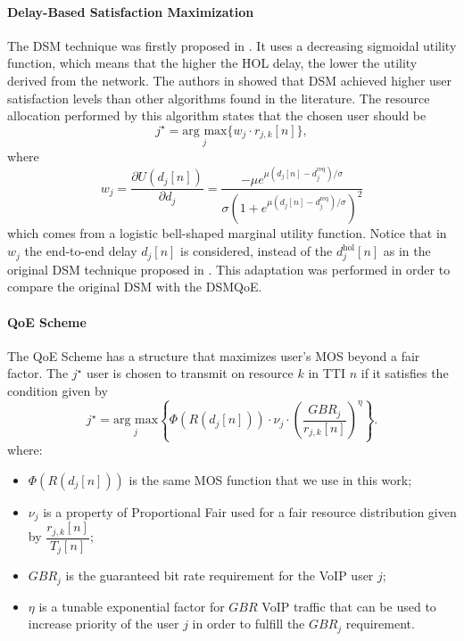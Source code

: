 \documentclass[12pt]{article}
\begin{document}
\paragraph{Delay-Based Satisfaction Maximization\\}
The \ac{DSM} technique was firstly proposed in \cite{Rodrigues2014_Wiley}. It uses a decreasing sigmoidal utility function, which means that the higher the HOL delay, the lower the utility derived from the network. The authors in \cite{Rodrigues2014_Wiley} showed that DSM achieved higher user satisfaction levels than other algorithms found in the literature. The resource allocation performed by this algorithm states that the chosen user should be 
\begin{equation}
\label{Eq:DSMArgmax}
j^{\star} = \underset{j}{\text{arg max}}\Big\{w_j \cdot {r_{j, k}[n]}\Big \},
\end{equation}
%
where
%
\begin{equation}
\label{DSMMarginal}
w_{j} = \dfrac{\partial U(d_{j}[n])}{\partial d_{j}} = \dfrac{- \mu  e^{\mu (d_{j}[n] - d_{j}^{\text{req}}) / \sigma}}{\sigma \left(1 + e^{\mu (d_{j}[n] - d_{j}^{\text{req}}) / \sigma}\right)^{2}}
\end{equation}
%
which comes from a logistic bell-shaped marginal utility function. Notice that in $w_{j}$ the end-to-end delay $d_{j}[n]$ is considered, instead of the $d_{j}^\mathrm{hol}\left[n\right]$  as in the original DSM technique proposed in \cite{Rodrigues2014_Wiley}. This adaptation was performed in order to compare the original DSM with the DSMQoE.

\paragraph{QoE Scheme\\} 
The QoE Scheme \cite{mushtaq2014qoe} has a structure that maximizes user's \ac{MOS} beyond a fair factor. The $j^\star$ user is chosen to transmit on resource $k$ in \ac{TTI} $n$ if it satisfies the condition given by
%
\begin{equation}
\label{Eq:QoESchemeArgmax}
j^{\star} = \underset{j}{\text{arg max}}\left\{ {{\Phi\left(R\left(d_j[n]\right)\right)\cdot \nu_j\cdot \left(\frac{GBR_j}{r_{j, k}[n]}\right)^\eta}}\right\}.
\end{equation}
%
where:
%
\begin{itemize}
	\item $\Phi\left(R\left(d_j[n]\right)\right)$ is the same \ac{MOS} function that we use in this work;
	\item $\nu_j$ is a property of Proportional Fair \cite{Kelly1997} used for a fair resource distribution given by $\dfrac{r_{j, k}[n]}{T_j[n]}$;
	\item $GBR_j$ is the guaranteed bit rate requirement for the \ac{VoIP} user $j$;
	\item $\eta$ is a tunable exponential factor for $GBR$ \ac{VoIP} traffic that can be used to increase priority of the user $j$ in order to fulfill the $GBR_j$ requirement.
\end{itemize}
\end{document}
